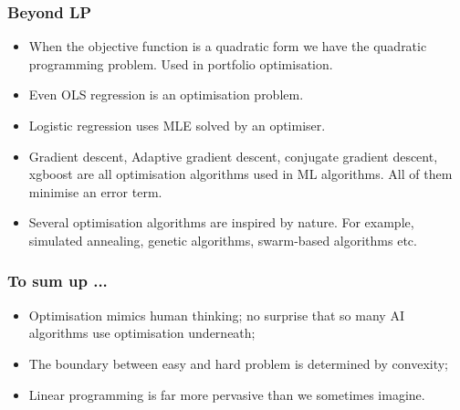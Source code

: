 \documentclass{beamer}
\begin{document}
\begin{frame}
\frametitle{Beyond LP}
\begin{itemize}
\item When the objective function is a quadratic form we have the quadratic 
programming problem. Used in portfolio optimisation.
\item Even OLS regression is an optimisation problem.
\item Logistic regression uses MLE solved by an optimiser.
\item Gradient descent, Adaptive gradient descent, conjugate gradient descent,
xgboost are all optimisation algorithms used in ML algorithms. All of them 
minimise an error term.
\item Several optimisation algorithms are inspired by nature. For example,
simulated annealing, genetic algorithms, swarm-based algorithms etc.
\end{itemize}
\end{frame}

\begin{frame}
\frametitle{To sum up ...}
\begin{itemize}
\item Optimisation mimics human thinking; no surprise that so many AI
algorithms use optimisation underneath;
\item The boundary between easy and hard problem is determined by convexity;
\item Linear programming is far more pervasive than we sometimes imagine.
\end{itemize}
\end{frame}
\end{document}
